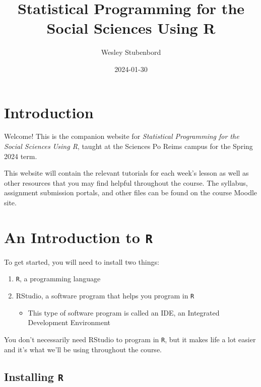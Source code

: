 \documentclass[
]{book}
\title{Statistical Programming for the Social Sciences Using R}
\author{Wesley Stubenbord}
\date{2024-01-30}
\providecommand{\tightlist}{%
  \setlength{\itemsep}{0pt}\setlength{\parskip}{0pt}}
\begin{document}
\maketitle

{
\setcounter{tocdepth}{1}
\tableofcontents
}
\hypertarget{introduction}{%
\chapter*{Introduction}\label{introduction}}

Welcome! This is the companion website for \emph{Statistical Programming for the Social Sciences Using R}, taught at the Sciences Po Reims campus for the Spring 2024 term.

This website will contain the relevant tutorials for each week's lesson as well as other resources that you may find helpful throughout the course. The syllabus, assignment submission portals, and other files can be found on the course Moodle site.

\hypertarget{an-introduction-to-r}{%
\chapter{\texorpdfstring{An Introduction to \texttt{R}}{An Introduction to R}}\label{an-introduction-to-r}}

To get started, you will need to install two things:

\begin{enumerate}
\def\labelenumi{\arabic{enumi}.}
\item
  \texttt{R}, a programming language
\item
  RStudio, a software program that helps you program in \texttt{R}

  \begin{itemize}
  \tightlist
  \item
    This type of software program is called an IDE, an Integrated Development Environment
  \end{itemize}
\end{enumerate}

You don't necessarily need RStudio to program in \texttt{R}, but it makes life a lot easier and it's what we'll be using throughout the course.

\hypertarget{installing-r}{%
\section{\texorpdfstring{Installing \texttt{R}}{Installing R}}\label{installing-r}}
\end{document}
